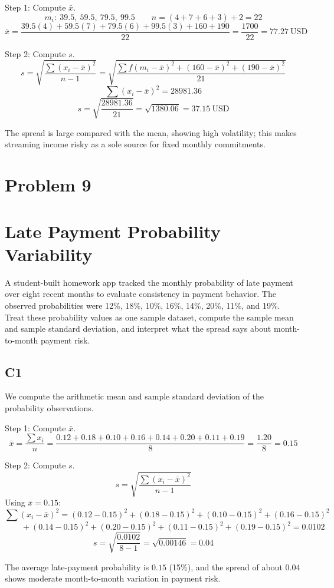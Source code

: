 \begin{ExamProblems}
		Step 1: Compute $\bar{x}$.
		\[
		m_i:\ 39.5,\ 59.5,\ 79.5,\ 99.5
		\qquad
		n = (4+7+6+3)+2 = 22
		\]
		\[
		\bar{x} = \frac{39.5(4)+59.5(7)+79.5(6)+99.5(3)+160+190}{22}
		= \frac{1700}{22}
		= 77.27\ \text{USD}
		\]

		Step 2: Compute $s$.
		\[
		s = \sqrt{\frac{\sum (x_i-\bar{x})^2}{n-1}}
		= \sqrt{\frac{\sum f(m_i-\bar{x})^2 + (160-\bar{x})^2 + (190-\bar{x})^2}{21}}
		\]
		\[
		\sum (x_i-\bar{x})^2 = 28981.36
		\]
		\[
		s = \sqrt{\frac{28981.36}{21}} = \sqrt{1380.06} = 37.15\ \text{USD}
		\]

		The spread is large compared with the mean, showing high volatility; this makes streaming income risky as a sole source for fixed monthly commitments.

		\newpage
		\item
		\section{Problem 9}
		\section{Late Payment Probability Variability}
		A student-built homework app tracked the monthly probability of late payment over eight recent months to evaluate consistency in payment behavior. The observed probabilities were 12\%, 18\%, 10\%, 16\%, 14\%, 20\%, 11\%, and 19\%. Treat these probability values as one sample dataset, compute the sample mean and sample standard deviation, and interpret what the spread says about month-to-month payment risk.

		\subsection*{C1}
		We compute the arithmetic mean and sample standard deviation of the probability observations.

		Step 1: Compute $\bar{x}$.
		\[
		\bar{x} = \frac{\sum x_i}{n}
		= \frac{0.12+0.18+0.10+0.16+0.14+0.20+0.11+0.19}{8}
		= \frac{1.20}{8}
		= 0.15
		\]

		Step 2: Compute $s$.
		\[
		s = \sqrt{\frac{\sum (x_i-\bar{x})^2}{n-1}}
		\]
		Using $\bar{x}=0.15$:
		\[
		\sum (x_i-\bar{x})^2 = (0.12-0.15)^2+(0.18-0.15)^2+(0.10-0.15)^2+(0.16-0.15)^2
		\]
		\[
		\qquad +(0.14-0.15)^2+(0.20-0.15)^2+(0.11-0.15)^2+(0.19-0.15)^2 = 0.0102
		\]
		\[
		s = \sqrt{\frac{0.0102}{8-1}} = \sqrt{0.00146} = 0.04
		\]

		The average late-payment probability is $0.15$ (15\%), and the spread of about $0.04$ shows moderate month-to-month variation in payment risk.


\end{ExamProblems}
